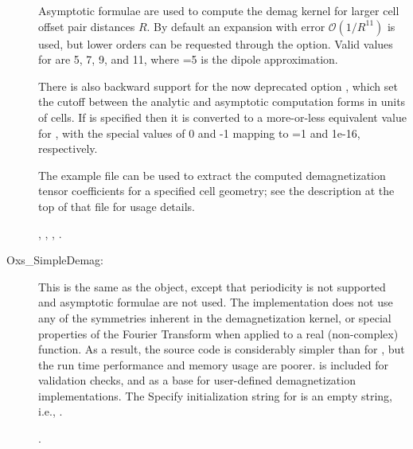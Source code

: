 \begin{description}
   Asymptotic formulae are used to compute the demag kernel for larger
   cell offset pair distances $R$. By default an expansion with error
   $\mathcal{O}\left(1/R^{11}\right)$ is used, but lower orders can be
   requested through the  option. Valid values for
    are 5, 7, 9, and 11, where
   =5 is the dipole approximation.

   There is also backward support for the now deprecated option
   , which set the cutoff between the
   analytic and asymptotic computation forms in units of cells. If
    is specified then it is converted to a
   more-or-less equivalent value for , with
   the special values of 0 and -1 mapping to =1 and
   1e-16, respectively.

   The example file  can be used to extract the
   computed demagnetization tensor coefficients for a specified cell
   geometry; see the description at the top of that file for usage
   details.

   \begin{ExampleMifs}
     , , , .
   \end{ExampleMifs}

\item[Oxs\_SimpleDemag:]
%
   This is the same as the  object, except that
   periodicity is not supported and asymptotic formulae are not used.
   The implementation does not use any of the symmetries
   inherent in the demagnetization kernel, or special properties of the
   Fourier Transform when applied to a real (non-complex) function.
   As a result, the source code is
   considerably simpler than for , but the run time
   performance and memory usage are poorer.   is
   included for validation checks, and as a base for user-defined
   demagnetization implementations.  The Specify initialization string
   for  is an empty string, i.e., \ocb\ccb.

   \begin{ExampleMifs}[Example]
     .
   \end{ExampleMifs}
\end{description}

